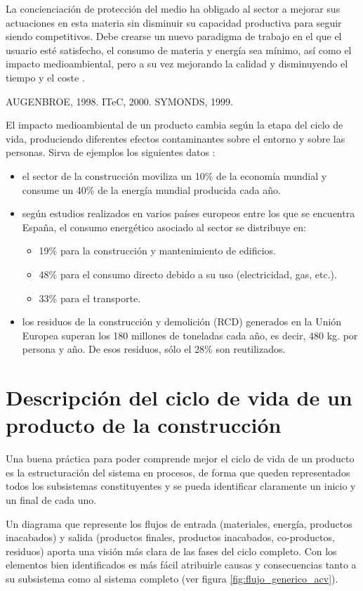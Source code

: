 La concienciación de protección del medio ha obligado al sector a mejorar sus actuaciones en esta materia sin disminuir su capacidad productiva para seguir siendo competitivos. Debe crearse un nuevo paradigma de trabajo en el que el usuario esté satisfecho, el consumo de materia y energía sea mínimo, así como el impacto medioambiental, pero a su vez mejorando la calidad y disminuyendo el tiempo y el coste \cite{carvalho}.

AUGENBROE, 1998.
ITeC, 2000.
SYMONDS, 1999.

El impacto medioambiental de un producto cambia según la etapa del ciclo de vida, produciendo diferentes efectos contaminantes sobre el entorno y sobre las personas. Sirva de ejemplos los siguientes datos \cite{carvalho}:
\begin{itemize}
\item el sector de la construcción moviliza un 10\% de la economía mundial y consume un 40\% de la energía mundial producida cada año.
\item según estudios realizados en varios países europeos entre los que se encuentra España, el consumo energético asociado al sector se distribuye en:
  \begin{itemize}
  \item 19\% para la construcción y mantenimiento de edificios.
  \item 48\% para el consumo directo debido a su uso (electricidad, gas, etc.).
  \item 33\% para el transporte.
  \end{itemize}
\item los residuos de la construcción y demolición (RCD) generados en la Unión Europea superan los 180 millones de toneladas cada año, es decir, 480 kg. por persona y año. De esos residuos, sólo el 28\% son reutilizados.
\end{itemize}

\section{Descripción del ciclo de vida de un producto de la construcción}
Una buena práctica para poder comprende mejor el ciclo de vida de un producto es la estructuración del sistema en procesos, de forma que queden representados todos los subsistemas constituyentes y se pueda identificar claramente un inicio y un final de cada uno.

Un diagrama que represente los flujos de entrada (materiales, energía, productos inacabados) y salida (productos finales, productos inacabados, co-productos, residuos) aporta una visión más clara de las fases del ciclo completo. Con los elementos bien identificados es más fácil atribuirle causas y consecuencias tanto a su subsistema como al sistema completo (ver figura \ref{fig:flujo_generico_acv}).

